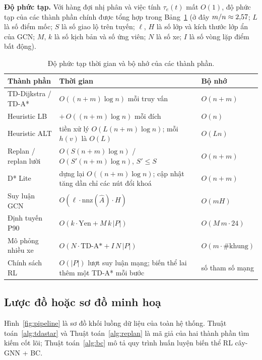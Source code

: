 \textbf{Độ phức tạp.} Với hàng đợi nhị phân và việc tính $\tau_e(t)$ mất $O(1)$, độ phức tạp của các thành phần chính được
tổng hợp trong Bảng~\ref{tab:complexity} (ở đây $m/n\approx2{,}57$; $L$ là số điểm mốc; $S$ là số giao lộ trên tuyến;
$\ell$, $H$ là số lớp và kích thước lớp ẩn của GCN; $M$, $k$ là số kịch bản và số ứng viên; $N$ là số xe; $I$ là số vòng
lặp điểm bất động).

\begin{table}[H]
\centering\small
\renewcommand{\arraystretch}{1.25}
\caption{Độ phức tạp thời gian và bộ nhớ của các thành phần.}
\label{tab:complexity}
\begin{tabularx}{\linewidth}{>{\raggedright\arraybackslash}p{4.2cm}>{\raggedright\arraybackslash}X>{\raggedright\arraybackslash}p{3.2cm}}
\toprule
\textbf{Thành phần} & \textbf{Thời gian} & \textbf{Bộ nhớ} \\
\midrule
TD-Dijkstra / TD-A* & $O((n+m)\log n)$ mỗi truy vấn & $O(n+m)$ \\
Heuristic LB & $+\,O((n+m)\log n)$ mỗi đích & $O(n)$ \\
Heuristic ALT & tiền xử lý $O(L(n+m)\log n)$; mỗi $h(v)$ là $O(L)$ & $O(Ln)$ \\
Replan / replan lười & $O(S(n+m)\log n)$ / $O(S'(n+m)\log n)$, $S'\le S$ & $O(n+m)$ \\
D* Lite & dựng lại $O((n+m)\log n)$; cập nhật tăng dần chỉ các nút đổi khoá & $O(n+m)$ \\
Suy luận GCN & $O(\ell\cdot\text{nnz}(\hat{A})\cdot H)$ & $O(mH)$ \\
Định tuyến P90 & $O(k\cdot\text{Yen} + M\,k\,|P|)$ & $O(M\,m\cdot 24)$ \\
Mô phỏng nhiều xe & $O(N\cdot\text{TD-A*} + I\,N\,|P|)$ & $O(m\cdot \#\text{khung})$ \\
Chính sách RL & $O(|P|)$ lượt suy luận mạng; biến thể lai thêm một TD-A* mỗi bước & số tham số mạng \\
\bottomrule
\end{tabularx}
\end{table}

\subsection{Lược đồ hoặc sơ đồ minh hoạ}\label{sec:method:diagram}

Hình~\ref{fig:pipeline} là sơ đồ khối luồng dữ liệu của toàn hệ thống. Thuật toán~\ref{alg:tdastar} và
Thuật toán~\ref{alg:replan} là mã giả của hai thành phần tìm kiếm cốt lõi; Thuật toán~\ref{alg:bc} mô tả quy trình huấn
luyện biến thể RL cây-GNN + BC.

